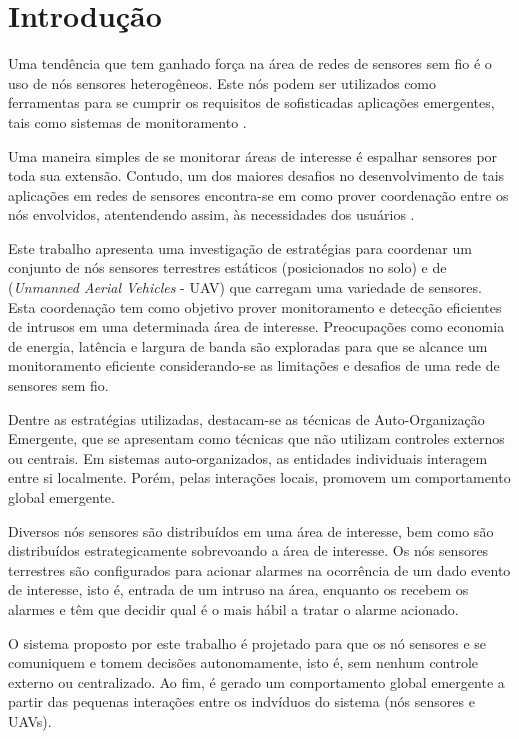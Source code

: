 \chapter{Introdução}
\label{chap:Introdução}

Uma tendência que tem ganhado força na área de redes de sensores sem fio é o uso de nós sensores heterogêneos. Este nós podem ser utilizados como ferramentas para se cumprir os requisitos de sofisticadas aplicações emergentes, tais como sistemas de monitoramento \cite{Freitas20092}.

Uma maneira simples de se monitorar áreas de interesse é espalhar sensores por toda sua extensão. Contudo, um dos maiores desafios no desenvolvimento de tais aplicações em redes de sensores encontra-se em como prover coordenação entre os nós envolvidos, atentendendo assim, às necessidades dos usuários \cite{Mhatre2005}.

Este trabalho apresenta uma investigação de estratégias para coordenar um conjunto de nós sensores terrestres estáticos (posicionados no solo) e de \uavs (\emph{Unmanned Aerial Vehicles} - UAV) que carregam uma variedade de sensores. Esta coordenação tem como objetivo prover monitoramento e detecção eficientes de intrusos em uma determinada área de interesse. Preocupações como economia de energia, latência e largura de banda são exploradas para que se alcance um monitoramento eficiente considerando-se as limitações e desafios de uma rede de sensores sem fio.

Dentre as estratégias utilizadas, destacam-se as técnicas de Auto-Organização Emergente, que se apresentam como técnicas que não utilizam controles externos ou centrais. Em sistemas auto-organizados, as entidades individuais interagem entre si localmente. Porém, pelas interações locais, promovem um comportamento global emergente.

Diversos nós sensores são distribuídos em uma área de interesse, bem como são distribuídos estrategicamente \vants sobrevoando a área de interesse. Os nós sensores terrestres são configurados para acionar alarmes na ocorrência de um dado evento de interesse, isto é, entrada de um intruso na área, enquanto os \vants recebem os alarmes e têm que decidir qual \vant é o mais hábil a tratar o alarme acionado.

O sistema proposto por este trabalho é projetado para que os nó sensores e \vants se comuniquem e tomem decisões autonomamente, isto é, sem nenhum controle externo ou centralizado. Ao fim, é gerado um comportamento global emergente a partir das pequenas interações entre os indvíduos do sistema (nós sensores e UAVs).


